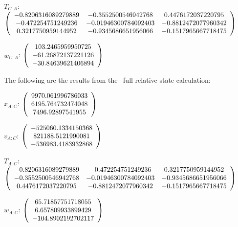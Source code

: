 \begin{description}
$T_{C:A}$: $\left( \begin{array} {ccc}
 -0.8206316089279889 &   -0.3552500546942768 &    0.4476172037220795 \\
  -0.472254751249236 &  -0.01946300784092403 &   -0.8812472077960342 \\
  0.3217750959144952 &   -0.9345686651956066 &   -0.1517965667718475 \\
\end{array} \right)\\ \\$

$w_{C:A}$:  $\left( \begin{array} {ccc} 103.2465959950725 \\    -61.26872137221126 \\    -30.84639621406894
\end{array} \right)\\ \\$

The following are the results from the \ full relative state calculation:

$x_{A:C}$: $\left( \begin{array} {ccc} 9970.061996786033 \\     6195.764732474048 \\      7496.92897541955
\end{array} \right)\\ \\$

$v_{A:C}$:  $\left( \begin{array} {ccc}  -525060.1334150368 \\     821188.5121990081 \\    -536983.4183932868
\end{array} \right)\\ \\$

$T_{A:C}$: $\left( \begin{array} {ccc}
 -0.8206316089279889 &    -0.472254751249236 &    0.3217750959144952 \\
  -0.3552500546942768 &  -0.01946300784092403 &   -0.9345686651956066 \\
  0.4476172037220795 &   -0.8812472077960342 &   -0.1517965667718475 \\
\end{array} \right)\\ \\$

$w_{A:C}$:  $\left( \begin{array} {ccc}  65.71857751718055 \\     6.657809933899429 \\    -104.8902192702117
\end{array} \right)\\ \\$


\end{description}
